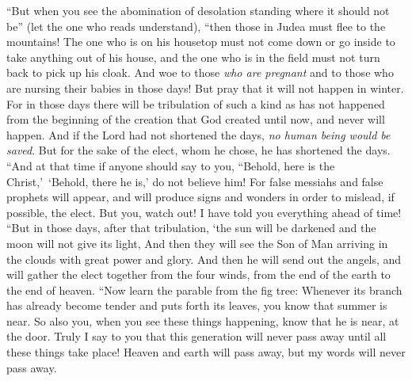 \begin{biblechapter}
 “But when you see the abomination of desolation standing where it should not be” (let the one who reads understand), “then those in Judea must flee to the mountains!
\verse The one who is on his housetop must not come down or go inside to take anything out of his house,
\verse and the one who is in the field must not turn back to pick up his cloak.
\verse And woe to those \textit{who are pregnant} and to those who are nursing their babies in those days!
\verse But pray that it will not happen in winter.
\verse For in those days there will be tribulation of such a kind as has not happened from the beginning of the creation that God created until now, and never will happen.
\verse And if the Lord had not shortened the days, \textit{no human being would be saved}. But for the sake of the elect, whom he chose, he has shortened the days.
\verse “And at that time if anyone should say to you, “Behold, here is the Christ,’ ‘Behold, there he is,’ do not believe him!
\verse For false messiahs and false prophets will appear, and will produce signs and wonders in order to mislead, if possible, the elect.
\verse But you, watch out! I have told you everything ahead of time!
 “But in those days, after that tribulation,
\verse ‘the sun will be darkened 
and the moon will not give its light,
\verse And then they will see the Son of Man arriving in the clouds with great power and glory.
\verse And then he will send out the angels, and will gather the elect together from the four winds, from the end of the earth to the end of heaven.
 “Now learn the parable from the fig tree: Whenever its branch has already become tender and puts forth its leaves, you know that summer is near.
\verse So also you, when you see these things happening, know that he is near, at the door.
\verse Truly I say to you that this generation will never pass away until all these things take place!
\verse Heaven and earth will pass away, but my words will never pass away.

\end{biblechapter}
